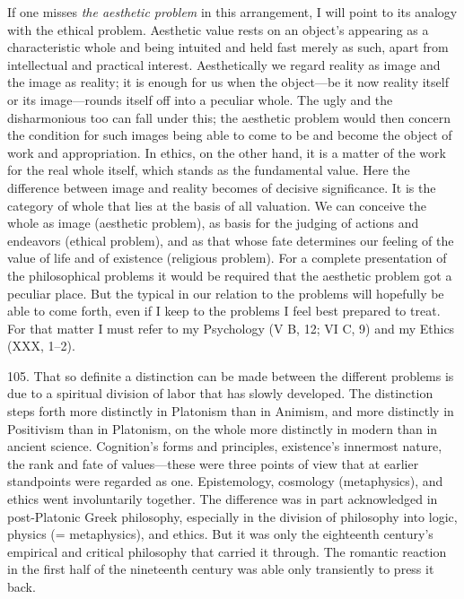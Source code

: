 \documentclass[12pt,a4paper]{book}
\newcommand{\opage}[1]{\marginnote{\footnotesize\textit{[#1]}}}
\begin{document}
If one misses \emph{the aesthetic problem} in this arrangement, I will point
to its analogy with the ethical problem. Aesthetic value rests on an object's
appearing as a characteristic whole and being intuited and held fast merely as
such, apart from intellectual and practical interest. Aesthetically we regard
reality as image and the image as reality; it is enough for us when the
object---be it now reality itself or its image---rounds itself off into a
peculiar whole. The ugly and the disharmonious too can fall under this; the
aesthetic problem would then concern the condition for such images being able
to come to be and become the object of work and appropriation. In ethics, on
the other hand, it is a matter of the work for the real whole itself, which
stands as the fundamental value. Here the difference between image and reality
becomes of decisive significance. It is the category of whole that lies at the
basis of all valuation. We can conceive the whole as image (aesthetic
problem), as basis for the judging of actions and endeavors (ethical problem),
and as that whose fate determines \opage{251}our feeling of the value of life and of
existence (religious problem). For a complete presentation of the
philosophical problems it would be required that the aesthetic problem got a
peculiar place. But the typical in our relation to the problems will hopefully
be able to come forth, even if I keep to the problems I feel best prepared to
treat. For that matter I must refer to my Psychology (V B, 12; VI C, 9) and my
Ethics (XXX, 1--2).

105. That so definite a distinction can be made between the different problems
is due to a spiritual division of labor that has slowly developed. The
distinction steps forth more distinctly in Platonism than in Animism, and
more distinctly in Positivism than in Platonism, on the whole more distinctly
in modern than in ancient science. Cognition's forms and principles,
existence's innermost nature, the rank and fate of values---these were three
points of view that at earlier standpoints were regarded as one. Epistemology,
cosmology (metaphysics), and ethics went involuntarily together. The
difference was in part acknowledged in post-Platonic Greek philosophy,
especially in the division of philosophy into logic, physics (= metaphysics),
and ethics. But it was only the eighteenth century's empirical and critical
philosophy that carried it through. The romantic reaction in the first half of
the nineteenth century was able only transiently to press it back.
\end{document}
